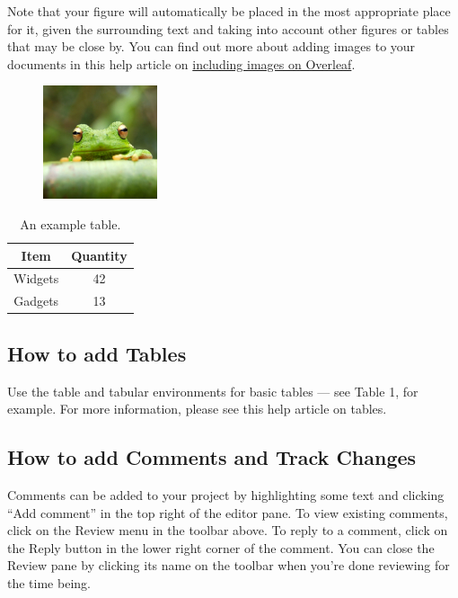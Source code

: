 \documentclass[10pt,english]{article}
\begin{document}
	    Note that your figure will automatically be placed in the most appropriate place for it, given the
	  surrounding text and taking into account other figures or tables that may be close by. You can find
	  out more about adding images to your documents in this help article on \href{https://www.overleaf.com/learn/how-to/Including_images_on_Overleaf}{including images on Overleaf}.
	  \begin{figure}[h!tbp]
	  	\centering
	  	\includegraphics[width=0.3\textwidth]{frog.png}
	  \end{figure}
	  
	 \begin{table}[h]
	 	\centering
	 	\begin{tabular}{c|c}	
	 	
	 	{Item} & {Quantity}\\
	 	\hline
	 	Widgets&42\\
	 	
	 	Gadgets&13\\
	 
	\end{tabular}
	\caption{An example table.}
	\label{tab:Example}
	\end{table}
	
	\subsection{How to add Tables}
	Use the table and tabular environments for basic tables — see Table 1, for example. For more information, please see this help article on tables.
	\subsection{How to add Comments and Track Changes}
	Comments can be added to your project by highlighting some text and clicking “Add comment” in
	the top right of the editor pane. To view existing comments, click on the Review menu in the toolbar
	above. To reply to a comment, click on the Reply button in the lower right corner of the comment.
	You can close the Review pane by clicking its name on the toolbar when you’re done reviewing for the
	time being.
	
\end{document}

